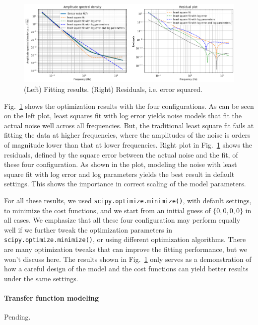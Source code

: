 \begin{figure}[!h]
	\centering
	\includegraphics[width=1\linewidth]{figures/tutorials_noise_spectrum_modeling_with_optimization_8_0}
	\caption{(Left) Fitting results. (Right) Residuals, i.e. error squared.}
	\label{fig:tutorialsnoisespectrummodelingwithoptimization80}
\end{figure}

Fig.~\ref{fig:tutorialsnoisespectrummodelingwithoptimization80} shows the optimization results with the four configurations.
As can be seen on the left plot, least squares fit with log error yields noise models that fit the actual noise well across all frequencies.
But, the traditional least square fit fails at fitting the data at higher frequencies, where the amplitudes of the noise is orders of magnitude lower than that at lower frequencies.
Right plot in Fig.~\ref{fig:tutorialsnoisespectrummodelingwithoptimization80} shows the residuals, defined by the square error between the actual noise and the fit, of these four configuration.
As shown in the plot, modeling the noise with least square fit with log error and log parameters yields the best result in default settings.
This shows the importance in correct scaling of the model parameters.

For all these results, we used \verb|scipy.optimize.minimize()|, with default settings, to minimize the cost functions, and we start from an initial guess of $\{0, 0, 0, 0\}$ in all cases.
We emphasize that all these four configuration may perform equally well if we further tweak the optimization parameters in \verb|scipy.optimize.minimize()|, or using different optimization algorithms.
There are many optimization tweaks that can improve the fitting performance, but we won't discuss here.
The results shown in Fig.~\ref{fig:tutorialsnoisespectrummodelingwithoptimization80} only serves as a demonstration of how a careful design of the model and the cost functions can yield better results under the same settings.

\paragraph{Transfer function modeling}

Pending.